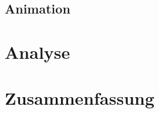 \documentclass[a4paper,12pt]{llncs}
\numberwithin{equation}{section}
\begin{document}

\fi
\subsection{Animation}\label{subs:vis:anime}

\fi
\section{Analyse}\label{sec:analy}

\fi
\section{Zusammenfassung}

\fi
\newpage

 

\end{document}
